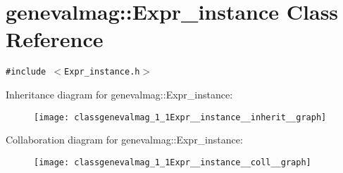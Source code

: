 \hypertarget{classgenevalmag_1_1Expr__instance}{
\section{genevalmag::Expr\_\-instance Class Reference}
\label{classgenevalmag_1_1Expr__instance}
}
{\tt \#include $<$Expr\_\-instance.h$>$}

Inheritance diagram for genevalmag::Expr\_\-instance:\nopagebreak
\begin{figure}[H]
\begin{center}
\leavevmode
\texttt{[image: classgenevalmag\_1\_1Expr\_\_instance\_\_inherit\_\_graph]}
\end{center}
\end{figure}
Collaboration diagram for genevalmag::Expr\_\-instance:\nopagebreak
\begin{figure}[H]
\begin{center}
\leavevmode
\texttt{[image: classgenevalmag\_1\_1Expr\_\_instance\_\_coll\_\_graph]}
\end{center}
\end{figure}
